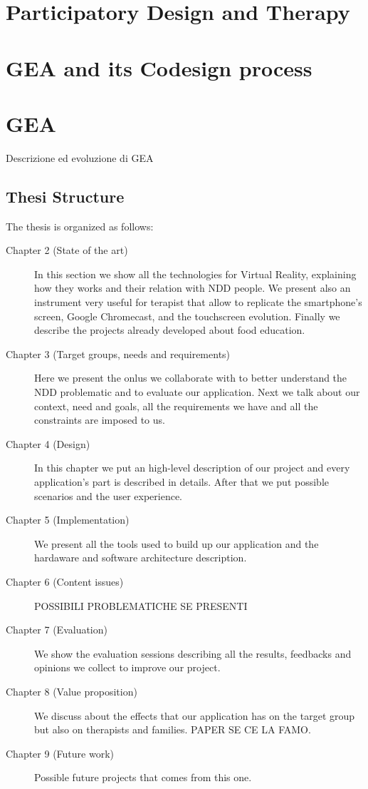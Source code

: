 \section{Participatory Design and Therapy}

\section{GEA and its Codesign process}

\section{GEA}
Descrizione ed evoluzione di GEA
\subsection{Thesi Structure}
The thesis is organized as follows:
\begin{description}
\item[Chapter 2 (State of the art)] In this section we show all the technologies for Virtual Reality, explaining how they works and their relation with NDD people. We present also an instrument very useful for terapist that allow to replicate the smartphone's screen, Google Chromecast, and the touchscreen evolution. Finally we describe the projects already developed about food education.
\item[Chapter 3 (Target groups, needs and requirements)] Here we present the onlus we collaborate with to better understand the NDD problematic and to evaluate our application. Next we talk about our context, need and goals, all the requirements we have and all the constraints are imposed to us.
\item[Chapter 4 (Design)] In this chapter we put an high-level description of our project and every application's part is described in details. After that we put possible scenarios and the user experience. 
\item[Chapter 5 (Implementation)] We present all the tools used to build up our application and the hardaware and software architecture description.
\item[Chapter 6 (Content issues)]POSSIBILI PROBLEMATICHE SE PRESENTI
\item[Chapter 7 (Evaluation)] We show the evaluation sessions describing all the results, feedbacks and opinions we collect to improve our project.
\item[Chapter 8 (Value proposition)] We discuss about the effects that our application has on the target group but also on therapists and families. PAPER SE CE LA FAMO.
\item[Chapter 9 (Future work)] Possible future projects that comes from this one.
\end{description}
 
